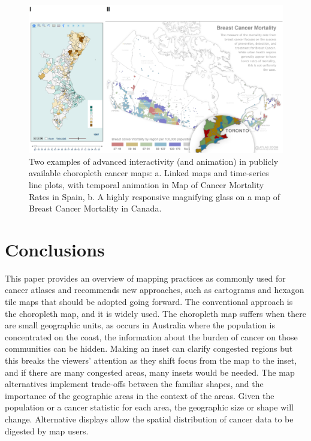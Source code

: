 \documentclass{monashthesis}
\begin{document}
\begin{figure}

{\centering \includegraphics[width=1\linewidth]{figures/02-literature/animating} 

}

\caption{Two examples of advanced interactivity (and animation) in publicly available choropleth cancer maps: a. Linked maps and time-series line plots, with temporal animation in Map of Cancer Mortality Rates in Spain, b. A highly responsive magnifying glass on a map of Breast Cancer Mortality in Canada.}\label{fig:animating}
\end{figure}

\hypertarget{conclusions}{%
\section{Conclusions}\label{conclusions}}

This paper provides an overview of mapping practices as commonly used for cancer atlases and recommends new approaches, such as cartograms and hexagon tile maps that should be adopted going forward. The conventional approach is the choropleth map, and it is widely used. The choropleth map suffers when there are small geographic units, as occurs in Australia where the population is concentrated on the coast, the information about the burden of cancer on those communities can be hidden. Making an inset can clarify congested regions but this breaks the viewers' attention as they shift focus from the map to the inset, and if there are many congested areas, many insets would be needed. The map alternatives implement trade-offs between the familiar shapes, and the importance of the geographic areas in the context of the areas. Given the population or a cancer statistic for each area, the geographic size or shape will change. Alternative displays allow the spatial distribution of cancer data to be digested by map users.
\end{document}
